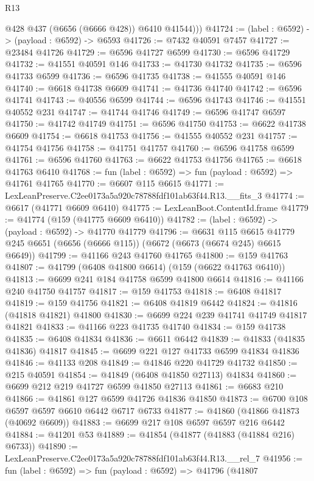 \begin{lexlean}{R13}
\begin{coremodule}
          @428
          @437
          (@6656 (@6666 @428))
          @6410
          @41544)))
@41724 := (label : @6592) -> (payload : @6592) -> @6593
@41726 := @7432 @40591 @7457
@41727 := @23484 @41726
@41729 := @6596 @41727 @6599
@41730 := @6596 @41729
@41732 := @41551 @40591 @146
@41733 := @41730 @41732
@41735 := @6596 @41733 @6599
@41736 := @6596 @41735
@41738 := @41555 @40591 @146
@41740 := @6618 @41738 @6609
@41741 := @41736 @41740
@41742 := @6596 @41741
@41743 := @40556 @6599
@41744 := @6596 @41743
@41746 := @41551 @40552 @231
@41747 := @41744 @41746
@41749 := @6596 @41747 @6597
@41750 := @41742 @41749
@41751 := @6596 @41750
@41753 := @6622 @41738 @6609
@41754 := @6618 @41753
@41756 := @41555 @40552 @231
@41757 := @41754 @41756
@41758 := @41751 @41757
@41760 := @6596 @41758 @6599
@41761 := @6596 @41760
@41763 := @6622 @41753 @41756
@41765 := @6618 @41763 @6410
@41768 := fun (label : @6592) => fun (payload : @6592) => @41761 @41765
@41770 := @6607 @115 @6615
@41771 := LexLeanPreserve.C2ee0173a5a920c78788fdf101ab63f44.R13.__fits_3
@41774 := @6617 (@41771 @6609 @6410)
@41775 := LexLeanBoot.ContentId.frame
@41779 := @41774 (@159 (@41775 @6609 @6410))
@41782 := (label : @6592) -> (payload : @6592) -> @41770 @41779
@41796 := @6631
    @115
    @6615
    @41779
    @245
    @6651
    (@6656 (@6666 @115))
    (@6672 (@6673 (@6674 @245) @6615 @6649))
@41799 := @41166 @243 @41760 @41765
@41800 := @159 @41763
@41807 := @41799 (@6408 @41800 @6614) (@159 (@6622 @41763 @6410))
@41813 := @6699 @241 @184 @41758 @6599 @41800 @6614
@41816 := @41166 @240 @41750 @41757
@41817 := @159 @41753
@41818 := @6408 @41817
@41819 := @159 @41756
@41821 := @6408 @41819 @6442
@41824 := @41816 (@41818 @41821) @41800
@41830 := @6699 @224 @239 @41741 @41749 @41817 @41821
@41833 := @41166 @223 @41735 @41740
@41834 := @159 @41738
@41835 := @6408 @41834
@41836 := @6611 @6442
@41839 := @41833 (@41835 @41836) @41817
@41845 := @6699 @221 @127 @41733 @6599 @41834 @41836
@41846 := @41133 @208
@41849 := @41846 @220 @41729 @41732
@41850 := @215 @40591
@41854 := @41849 (@6408 @41850 @27113) @41834
@41860 := @6699 @212 @219 @41727 @6599 @41850 @27113
@41861 := @6683 @210
@41866 := @41861 @127 @6599 @41726 @41836 @41850
@41873 := @6700 @108 @6597 @6597 @6610 @6442 @6717 @6733
@41877 := @41860 (@41866 @41873 (@40692 @6609))
@41883 := @6699 @217 @108 @6597 @6597 @216 @6442
@41884 := @41201 @53
@41889 := @41854 (@41877 (@41883 (@41884 @216) @6733))
@41890 := LexLeanPreserve.C2ee0173a5a920c78788fdf101ab63f44.R13.__rel_7
@41956 := fun (label : @6592) =>
  fun (payload : @6592) =>
  @41796
    (@41807

\end{coremodule}
\end{lexlean}
